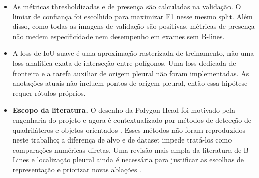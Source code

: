 \documentclass[11pt]{article}
\begin{document}
\begin{itemize}
\item As métricas thresholdizadas e de presença são calculadas na validação. O
limiar de confiança foi escolhido para maximizar F1 nesse mesmo split. Além disso,
como todas as imagens de validação são positivas, métricas de presença não medem
especificidade nem desempenho em exames sem B-lines.

\item A loss de IoU suave é uma aproximação rasterizada de treinamento, não uma
loss analítica exata de interseção entre polígonos. Uma loss dedicada de fronteira
e a tarefa auxiliar de origem pleural não foram implementadas. As anotações atuais
não incluem pontos de origem pleural, então essa hipótese requer rótulos próprios.

\item \textbf{Escopo da literatura.} O desenho da Polygon Head foi motivado pela
engenharia do projeto e agora é contextualizado por métodos de detecção de
quadriláteros e objetos orientados
\cite{zhou2017east,liao2018textboxes,xu2020gliding,ding2019roi,law2018cornernet}.
Esses métodos não foram reproduzidos neste trabalho; a diferença de alvo e de
dataset impede tratá-los como comparações numéricas diretas. Uma revisão mais
ampla da literatura de B-Lines e localização pleural ainda é necessária para
justificar as escolhas de representação e priorizar novas ablações
\cite{lucassen2023,nabawanuka2025,abbasi2025}.
\end{itemize}
\end{document}
